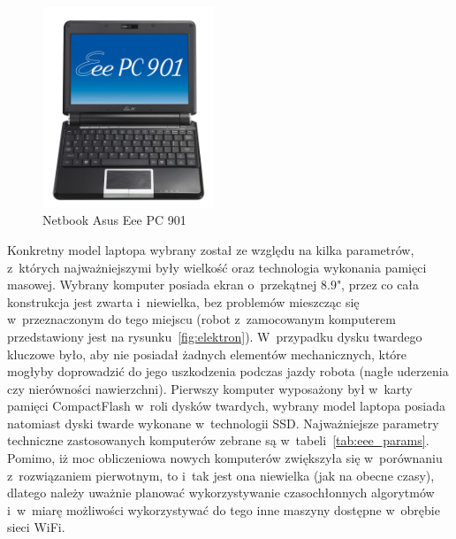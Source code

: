 \begin{figure}[h!]
\centering
\includegraphics[height=6cm]{../img/eee}
\caption{Netbook Asus Eee PC 901}
\label{fig:eee}
\end{figure}

Konkretny model laptopa wybrany został ze względu na kilka parametrów, z~których
najważniejszymi były wielkość oraz technologia wykonania pamięci masowej. Wybrany
komputer posiada ekran o~przekątnej 8.9", przez co cała konstrukcja jest zwarta
i~niewielka, bez problemów mieszcząc się w~przeznaczonym do tego miejscu (robot
z~zamocowanym komputerem przedstawiony jest na rysunku~\ref{fig:elektron}). W~przypadku
dysku twardego kluczowe było, aby nie posiadał żadnych elementów mechanicznych,
które mogłyby doprowadzić do jego uszkodzenia podczas jazdy robota (nagłe uderzenia
czy nierówności nawierzchni). Pierwszy komputer wyposażony był w~karty pamięci
CompactFlash w~roli dysków twardych, wybrany model laptopa posiada natomiast
dyski twarde wykonane w~technologii SSD. Najważniejsze parametry techniczne
zastosowanych komputerów zebrane są w~tabeli~\ref{tab:eee_params}.
Pomimo, iż moc obliczeniowa nowych komputerów zwiększyła się w~porównaniu 
z~rozwiązaniem pierwotnym, to i~tak jest ona niewielka (jak na obecne czasy),
dlatego należy uważnie planować wykorzystywanie czasochłonnych algorytmów 
i~w~miarę możliwości wykorzystywać do tego inne maszyny dostępne w~obrębie sieci
WiFi.

